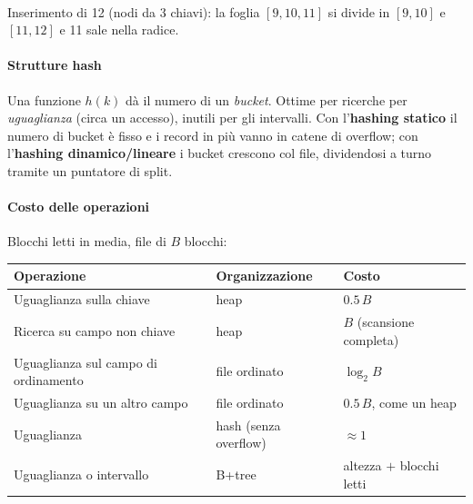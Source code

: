 \documentclass[12pt]{extarticle}
\begin{document}
\begin{center}
\\
{\small Inserimento di 12 (nodi da 3 chiavi): la foglia $[9,10,11]$ si divide in $[9,10]$ e $[11,12]$ e 11 sale nella radice.}
\end{center}

\paragraph{Strutture hash}
Una funzione $h(k)$ dà il numero di un \textit{bucket}. Ottime per ricerche per \emph{uguaglianza} (circa un accesso), inutili per gli intervalli. Con l'\textbf{hashing statico} il numero di bucket è fisso e i record in più vanno in catene di overflow; con l'\textbf{hashing dinamico/lineare} i bucket crescono col file, dividendosi a turno tramite un puntatore di split.

\paragraph{Costo delle operazioni}
Blocchi letti in media, file di $B$ blocchi:
\begin{center}
\small
\begin{tabular}{p{5.6cm}p{3.2cm}p{5.6cm}}
    \toprule
    \textbf{Operazione} & \textbf{Organizzazione} & \textbf{Costo} \\
    \midrule
    Uguaglianza sulla chiave & heap & $0.5\,B$ \\
    Ricerca su campo non chiave & heap & $B$ (scansione completa) \\
    Uguaglianza sul campo di ordinamento & file ordinato & $\log_2 B$ \\
    Uguaglianza su un altro campo & file ordinato & $0.5\,B$, come un heap \\
    Uguaglianza & hash (senza overflow) & $\approx 1$ \\
    Uguaglianza o intervallo & B+tree & altezza $+$ blocchi letti \\
    \bottomrule
\end{tabular}
\end{center}
\end{document}
